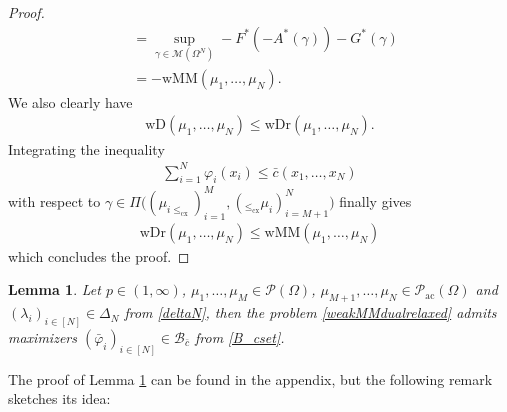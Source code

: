 \documentclass[10pt,a4paper]{amsart}
\newtheorem{lma}[thm]{Lemma}
\begin{document}
\begin{proof}
\begin{align*}
		&=\sup_{\gamma\in\mathcal M(\Omega^N)}-F^*(-A^*(\gamma))-G^*(\gamma)\\
		&=-\text{wMM}(\mu_1,\dots,\mu_N).
	\end{align*}
	We also clearly have
	\begin{gather*}
		\text{wD}(\mu_1,\dots,\mu_N)\leq\text{wDr}(\mu_1,\dots,\mu_N).
	\end{gather*}
	Integrating the inequality
	\begin{gather*}
		\sum_{i=1}^N\varphi_i(x_i)\leq \bar c(x_1,\dots,x_N)
	\end{gather*}
	with respect to $\gamma\in\Pi\big((\mu_{i\leq_{\text{cx}}})_{i=1}^M,(_{\leq_{\text{cx}}}\mu_i)_{i=M+1}^N\big)$ finally gives 
	\begin{gather*}
		\text{wDr}(\mu_1,\dots,\mu_N)\leq\text{wMM}(\mu_1,\dots,\mu_N)
	\end{gather*}
	which concludes the proof.
\end{proof}
\begin{lma}\label{dualattainmentlma}
	Let $p\in (1,\infty)$, $\mu_1,\dots,\mu_M\in\mathcal P(\Omega)$, $\mu_{M+1},\dots,\mu_N\in\mathcal P_{\text{ac}}(\Omega)$ and $(\lambda_i)_{i\in[N]}\in\Delta_N$ from \eqref{deltaN}, then the problem \eqref{weakMMdualrelaxed}
	admits maximizers $(\bar\varphi_i)_{i\in [N]}\in\mathcal B_{\bar c}$ from \eqref{B_cset}.
\end{lma}
The proof of Lemma \ref{dualattainmentlma} can be found in the appendix, but the following remark sketches its idea:
\end{document}
